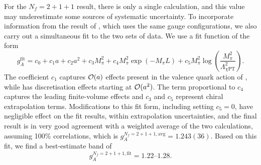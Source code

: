 For the $N_f = 2+1+1$ result, there is only a single calculation, and this value may underestimate some sources of systematic uncertainty. To incorporate
information from the result of \cite{Berkowitz:2017gql}, which uses the same gauge configurations, we also carry out a simultaneous fit to the two
sets of data. We use a fit function of the form
\begin{equation}
g_A^{\mathrm{fit}} = c_0 + c_1a + c_2a^2 + c_3M_\pi^2 + c_4M_\pi^2 \exp(−M_\pi L) +c_5M_\pi^2 \log\left(\frac{M_\pi^2}{\Lambda_{\chi \mathrm{PT}}^2}\right).
\end{equation}
The coefficient $c_1$ captures ${\cal O}(a)$ effects
present in the valence quark action of \cite{Bhattacharya:2016zcn}, while \cite{Berkowitz:2017gql} has discretisation effects starting at ${\cal O}(a^2)$. The 
term proportional to $c_4$ captures the leading finite-volume effects and $c_3$ and $c_5$ represent chiral extrapolation terms. Modifications to this fit form,
including  setting $c_5 = 0$,
have negligible effect on the fit results, within extrapolation uncertainties, and the final result is in very good agreement with a weighted average
of the two calculations, assuming 100\% correlations, which is $g_A^{N_f=2+1+1,\mathrm{avg}} = 1.243(36)$. Based on this fit, we find a best-estimate band
of
\begin{equation}\label{eq:gAfit}
g_A^{N_f=2+1+1,\mathrm{fit}} = \numrange{1.22}{1.28}.
\end{equation}

